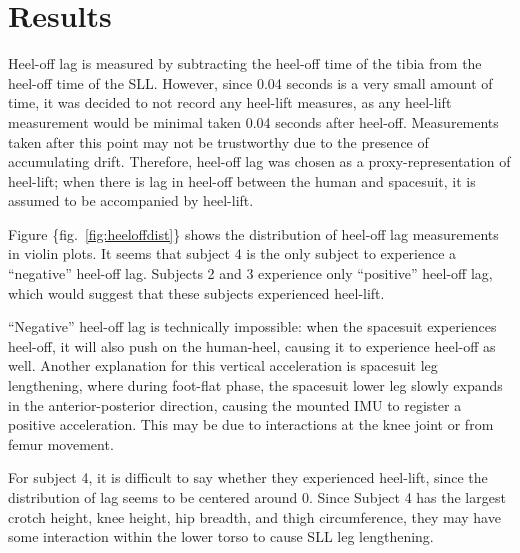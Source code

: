 \documentclass[defaultstyle,11pt]{comps}
\begin{document}
\hypertarget{results}{%
\section{Results}\label{results}}

Heel-off lag is measured by subtracting the heel-off time of the tibia from the heel-off time of the SLL.
However, since 0.04 seconds is a very small amount of time, it was decided to not record any heel-lift measures, as any heel-lift measurement would be minimal taken 0.04 seconds after heel-off. Measurements taken after this point may not be trustworthy due to the presence of accumulating drift. Therefore, heel-off lag was chosen as a proxy-representation of heel-lift; when there is lag in heel-off between the human and spacesuit, it is assumed to be accompanied by heel-lift.

Figure \{fig.~\ref{fig:heeloffdist}\} shows the distribution of heel-off lag measurements in violin plots.
It seems that subject 4 is the only subject to experience a ``negative'' heel-off lag.
Subjects 2 and 3 experience only ``positive'' heel-off lag, which would suggest that these subjects experienced heel-lift.

``Negative'' heel-off lag is technically impossible: when the spacesuit experiences heel-off, it will also push on the human-heel, causing it to experience heel-off as well.
Another explanation for this vertical acceleration is spacesuit leg lengthening, where during foot-flat phase, the spacesuit lower leg slowly expands in the anterior-posterior direction, causing the mounted IMU to register a positive acceleration.
This may be due to interactions at the knee joint or from femur movement.

For subject 4, it is difficult to say whether they experienced heel-lift, since the distribution of lag seems to be centered around 0. Since Subject 4 has the largest crotch height, knee height, hip breadth, and thigh circumference, they may have some interaction within the lower torso to cause SLL leg lengthening.
\end{document}
